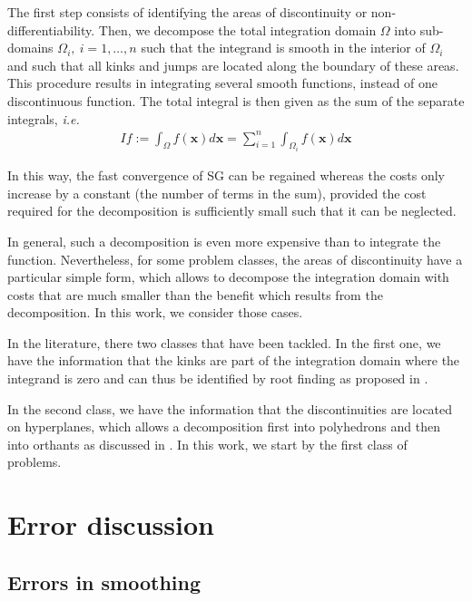 \documentclass[11pt]{article}
\newcommand{\ie}{\emph{i.e.}}
\begin{document}
The first step consists of identifying the areas 
of discontinuity or non-differentiability. Then, we decompose the total integration domain $\Omega$ into sub-domains $\Omega_i,\: i=1,\dots,n$ such that the
integrand is smooth in the interior of 
$\Omega_i$ and such that all kinks and jumps are
located along the boundary of these areas.  This procedure results in integrating several smooth functions, instead of one discontinuous function. The total integral is then given
as the sum of the separate integrals, \ie
\begin{align}
	I f := \int_{\Omega} f(\mathbf{x}) d \mathbf{x}=\sum_{i=1}^{n}	\int_{\Omega_i} f(\mathbf{x}) d \mathbf{x}
\end{align}

In this way, the fast convergence of SG can
be regained whereas the costs only increase by a constant (the number of terms in
the sum), provided the cost required for the decomposition is sufficiently small such that it can be neglected.




In general, such a decomposition is even more expensive than to integrate the function. Nevertheless, for some problem classes, the areas of discontinuity have a particular simple form, which allows to decompose the integration domain with
costs that are much smaller than the benefit which results from the decomposition.  In this work, we consider those cases.

In the literature, there two classes that have been tackled. In the first one, we have the information that the kinks are  part of the integration domain where the integrand is zero and can thus be identified by root finding as proposed in \cite{gerstner2007sparse}.

In the second class, we have the information that the discontinuities are located on hyperplanes, which allows a decomposition first into polyhedrons and then into
orthants as discussed in \cite{gerstner2008valuation}. In this work, we start by the first  class of problems.





\section{Error discussion}\label{sec:Error discussion}





\subsection{Errors in smoothing}
\label{sec:errors-smoothing}
\end{document}
